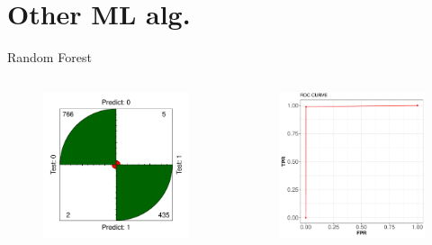\documentclass{beamer}
\begin{document}
\section{Other ML alg.}
\begin{frame}{Random Forest}
\begin{columns}
  \begin{figure}[b]{\textwidth}
    \includegraphics[width=\textwidth]{Pic/RF_confusion.pdf}
  \end{figure} 
  \begin{figure}[b]{\textwidth}
    \includegraphics[width=\textwidth]{Pic/ROC_RF.pdf}

\end{figure}
\end{columns}
\end{frame}
\end{document}
